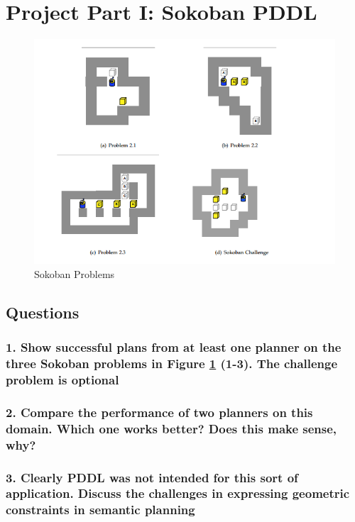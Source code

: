 \documentclass[10pt, letter]{article}
\begin{document}

\section{Project Part I: Sokoban PDDL}

\begin{figure}[h]
  \centering
    \includegraphics[scale = 0.3]{images/sokoban}
    \caption{Sokoban Problems}
  \label{fig2}
\end{figure}

\subsection{Questions}
\subsubsection*{1. Show successful plans from at least one planner on the three Sokoban problems in Figure \ref{fig2}
(1-3). The challenge problem is optional}
\subsubsection*{2. Compare the performance of two planners on this domain. Which one works better? Does this
make sense, why?}
\subsubsection*{3. Clearly PDDL was not intended for this sort of application. Discuss the challenges in expressing geometric constraints in semantic planning}
\end{document}
